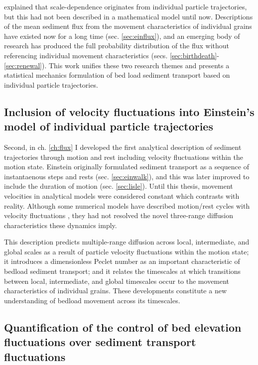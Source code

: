 \citet{Ballio2018} explained that scale-dependence originates from individual particle trajectories, but this had not been described in a mathematical model until now.
Descriptions of the mean sediment flux from the movement characteristics of individual grains have existed now for a long time (sec. \ref{sec:einflux}), and an emerging body of research has produced the full probability distribution of the flux without referencing individual movement characteristics (secs. \ref{sec:birthdeath}-\ref{sec:renewal}). 
This work unifies these two research themes and presents a statistical mechanics formulation of bed load sediment transport based on individual particle trajectories.

\subsection{Inclusion of velocity fluctuations into Einstein's model of individual particle trajectories}

Second, in ch. \ref{ch:flux} I developed the first analytical description of sediment trajectories through motion and rest including velocity fluctuations within the motion state.
Einstein originally formulated sediment transport as a sequence of instantaenous steps and rests (sec. \ref{sec:einwalk}), and this was later improved to include the duration of motion (sec. \ref{sec:lisle}).
Until this thesis, movement velocities in analytical models were considered constant which contrasts with reality. 
Although some numerical models have described motion/rest cycles with velocity fluctuations \citep{Fan2016,Bialik2012,Schmeeckle2014}, they had not resolved the novel three-range diffusion characteristics these dynamics imply.

This description predicts multiple-range diffusion across local, intermediate, and global scales as a result of particle velocity fluctuations within the motion state; it introduces a dimensionless Peclet number as an important characteristic of bedload sediment transport; and it relates the timescales at which transitions between local, intermediate, and global timescales occur to the movement characteristics of individual grains.
These developments constitute a new understanding of bedload movement across its timescales.

\subsection{Quantification of the control of bed elevation fluctuations over sediment transport fluctuations}

